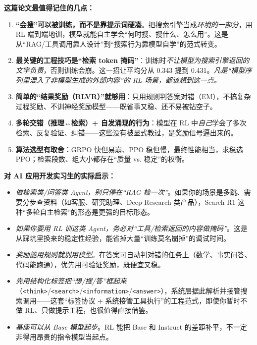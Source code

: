 \documentclass[11pt,UTF8,fontset=fandol]{ctexart}
\newcommand{\tg}[1]{\texttt{<#1>}}
\begin{document}
\textbf{这篇论文最值得记住的几点：}
\begin{enumerate}[leftmargin=1.6em]
\item \textbf{“会搜”可以被训练，而不是靠提示词硬凑}。把搜索引擎当成\emph{环境的一部分}，用 RL 端到端地训，模型就能自主学会“何时搜、搜什么、怎么用”。这是从“RAG/工具调用靠人设计”到“搜索行为靠模型自学”的范式转变。
\item \textbf{最关键的工程技巧是“检索 token 掩码”}：训练时\emph{不让模型为搜索引擎返回的文字负责}，否则训练会崩。这一招让平均分从 0.343 提到 0.431。\emph{凡是“模型序列里混入了非模型生成的外部内容”的 RL 场景，都该想到这一点。}
\item \textbf{简单的“结果奖励（RLVR）”就够用}：只用规则判答案对错（EM），不搞复杂过程奖励、不训神经奖励模型——既省事又稳、还不易被钻空子。
\item \textbf{多轮交错（推理↔检索）+ 自发涌现的行为}：模型在 RL 中\emph{自己}学会了多次检索、反复验证、纠错——这些没有被显式教过，是奖励信号逼出来的。
\item \textbf{算法选型有取舍}：GRPO 快但易崩、PPO 稳但慢，最终性能相当，求稳选 PPO；检索段数、组大小都存在“质量 vs. 稳定”的权衡。
\end{enumerate}

\textbf{对 AI 应用开发实习生的实际启示：}
\begin{itemize}[leftmargin=1.4em]
\item \emph{做检索类/问答类 Agent，别只停在“RAG 检一次”}。如果你的场景是多跳、需要分步查资料（如客服、研究助理、Deep-Research 类产品），Search-R1 这种“多轮自主检索”的形态是更强的目标形态。
\item \emph{如果你要用 RL 训这类 Agent，务必对“工具/检索返回的内容做掩码”}。这是从踩坑里换来的稳定性经验，能省掉大量“训练莫名崩掉”的调试时间。
\item \emph{奖励能用规则就别用模型}。在答案可自动判对错的任务上（数学、事实问答、代码能跑通），优先用可验证奖励，既便宜又稳。
\item \emph{先用结构化标签把“想/搜/答”框起来}（\tg{think}/\tg{search}/\tg{information}/\tg{answer}），系统层据此解析并接管搜索调用——这套“标签协议 + 系统接管工具执行”的工程范式，即使你暂时不做 RL、只做提示工程，也很值得直接借鉴。
\item \emph{基座可以从 Base 模型起步}。RL 能把 Base 和 Instruct 的差距补平，不一定非得用昂贵的指令模型当起点。
\end{itemize}

\end{document}

